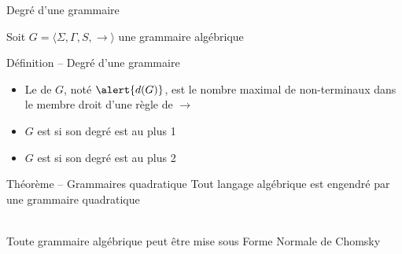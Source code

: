 
\begingroup

\begin{frame}{Degré d'une grammaire}
  
  Soit $G = \langle \Sigma, \Gamma, S, \rightarrow \rangle$ une grammaire algébrique\\
  \begin{block}{Définition -- Degré d'une grammaire}
    \begin{itemize}
    \item Le  de $G$, noté $\alert{d(G)}$,
      est le nombre maximal de non-terminaux dans le membre droit d'une règle de $\rightarrow$
    \item $G$ est  si son degré est au plus 1
      \begin{center}
      \end{center}
    \item $G$ est  si son degré est au plus 2
      \begin{center}
      \end{center}
    \end{itemize}
  \end{block}

  \begin{block}{Théorème -- Grammaires quadratique}
    Tout langage algébrique est engendré par une grammaire quadratique

    \vspace{3mm} \\Toute grammaire algébrique peut être mise sous Forme Normale de Chomsky
  \end{block}

\end{frame}

\endgroup
\endinput
